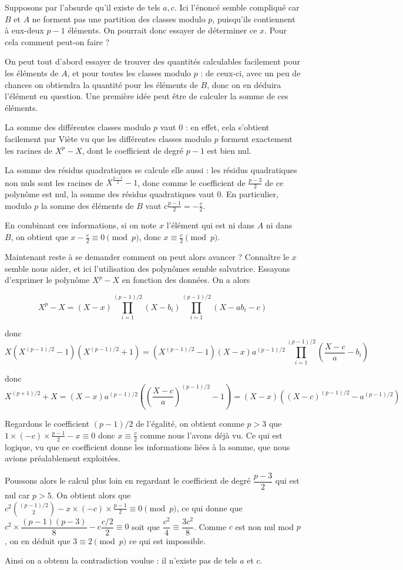 \begin{sol}
Supposons par l'absurde qu'il existe de tels $a,c$. Ici l'énoncé semble compliqué car $B$ et $A$ ne forment pas une partition des classes modulo $p$, puisqu'ils contiennent à eux-deux $p-1$ éléments. On pourrait donc essayer de déterminer ce $x$. Pour cela comment peut-on faire ?

On peut tout d'abord essayer de trouver des quantités calculables facilement pour les éléments de $A$, et pour toutes les classes modulo $p$ : de ceux-ci, avec un peu de chances on obtiendra la quantité pour les éléments de $B$, donc on en déduira l'élément en question. Une première idée peut être de calculer la somme de ces éléments.

La somme des différentes classes modulo $p$ vaut $0$ : en effet, cela s'obtient facilement par Viète vu que les différentes classes modulo $p$ forment exactement les racines de $X^p-X$, dont le coefficient de degré $p-1$ est bien nul.

La somme des résidus quadratiques se calcule elle aussi : les résidus quadratiques non nuls sont les racines de $X^{\frac{p-1}{2}}-1$, donc comme le coefficient de $\frac{p-3}{2}$ de ce polynôme est nul, la somme des résidus quadratiques vaut $0$. En particulier, modulo $p$ la somme des éléments de $B$ vaut $c\frac{p-1}{2}=-\frac{c}{2}$.

En combinant ces informations, si on note $x$ l'élément qui est ni dans $A$ ni dans $B$, on obtient que $x-\frac{c}{2}\equiv 0 \pmod{p}$, donc $x\equiv \frac{c}{2}\pmod{p}$.

Maintenant reste à se demander comment on peut alors avancer ? Connaître le $x$ semble nous aider, et ici l'utilisation des polynômes semble salvatrice. Essayons d'exprimer le polynôme $X^p-X$ en fonction des données. On a alors 

$$X^p-X=(X-x)\prod \limits_{i=1}^{(p-1)/2} (X-b_i)\prod \limits_{i=1}^{(p-1)/2} (X - ab_i-c)$$

donc $$X(X^{(p-1)/2}-1)(X^{(p-1)/2}+1)=(X^{(p-1)/2}-1)(X-x)a^{(p-1)/2}\prod \limits_{i=1}^{(p-1)/2} (\frac{X-c}{a}-b_i)$$

donc $$X^{(p+1)/2}+X=(X-x)a^{(p-1)/2} \left(\left(\frac{X-c}{a}\right)^{(p-1)/2}-1\right)=(X-x)((X-c)^{(p-1)/2}-a^{(p-1)/2})$$

Regardons le coefficient $(p-1)/2$ de l'égalité, on obtient comme $p>3$ que $1\times (-c) \times \frac{p-1}{2}-x\equiv 0$ donc $x\equiv \frac{c}{2}$ comme nous l'avons déjà vu. Ce qui est logique, vu que ce coefficient donne les informations liées à la somme, que nous avions préalablement exploitées.

Poussons alors le calcul plus loin en regardant le coefficient de degré $\dfrac{p-3}{2}$ qui est nul car $p>5$. On obtient alors que $c^2\binom{(p-1)/2}{2}-x\times (-c)\times \frac{p-1}{2}\equiv 0 \pmod{p}$, ce qui donne que $c^2\times \dfrac{(p-1)(p-3)}{8}-c\dfrac{c/2}{2}\equiv 0$ soit que $\dfrac{c^2}{4}\equiv \dfrac{3c^2}{8}$. Comme $c$ est non nul mod $p$, on en déduit que $3\equiv 2 \pmod{p}$ ce qui est impossible.

Ainsi on a obtenu la contradiction voulue : il n'existe pas de tels $a$ et $c$.
\end{sol}


